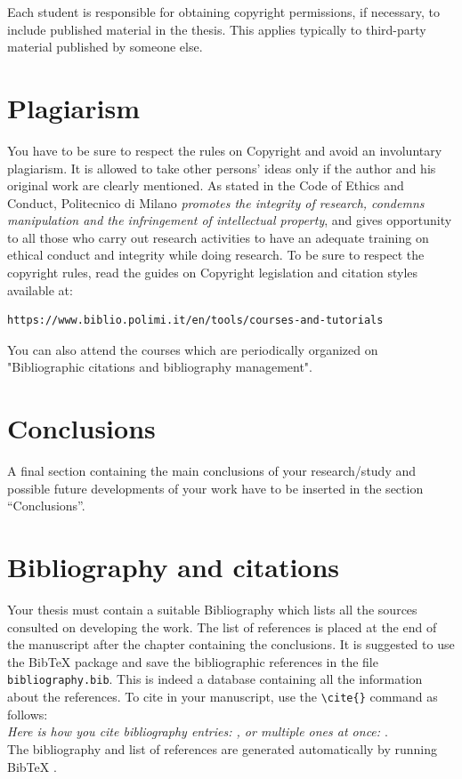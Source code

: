 \documentclass[11pt,a4paper]{article}
\begin{document}
Each student is responsible for obtaining copyright permissions, if necessary, to include published material in the thesis.
This applies typically to third-party material published by someone else.

\section{Plagiarism}

You have to be sure to respect the rules on Copyright and avoid an involuntary plagiarism.
It is allowed to take other persons' ideas only if the author and his original work are clearly mentioned.
As stated in the Code of Ethics and Conduct, Politecnico di Milano \textit{promotes the integrity of research,
	condemns manipulation and the infringement of intellectual property}, and gives opportunity to all those
who carry out research activities to have an adequate training on ethical conduct and integrity while doing research.
To be sure to respect the copyright rules, read the guides on Copyright legislation and citation styles available
at:
\begin{verbatim}
https://www.biblio.polimi.it/en/tools/courses-and-tutorials
\end{verbatim}
You can also attend the courses which are periodically organized on "Bibliographic citations and bibliography management".

\section{Conclusions}
\color{black}
A final section containing the main conclusions of your research/study
and possible future developments of your work have to be inserted in the section ``Conclusions''.

\section{Bibliography and citations}
Your thesis must contain a suitable Bibliography which lists all the sources consulted on developing the work.
The list of references is placed at the end of the manuscript after the chapter containing the conclusions.
It is suggested to use the BibTeX package and save the bibliographic references in the file \verb|bibliography.bib|.
This is indeed a database containing all the information about the references. To cite in your manuscript, use the \verb|\cite{}| command as follows:
\\
\textit{Here is how you cite bibliography entries: \cite{knuth74}, or multiple ones at once: \cite{knuth92,lamport94}}.
\\
The bibliography and list of references are generated automatically by running BibTeX \cite{bibtex}.
\end{document}
